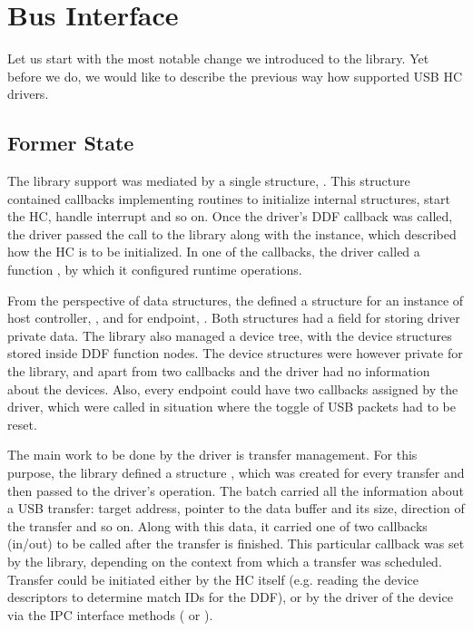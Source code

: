 \section{Bus Interface}

Let us start with the most notable change we introduced to the 
library. Yet before we do, we would like to describe the previous way how
 supported USB HC drivers.

\subsection{Former State}

The library support was mediated by a single structure,
. This structure contained callbacks implementing
routines to initialize internal structures, start the HC, handle interrupt and
so on. Once the driver's DDF callback  was called, the driver
passed the call to the library along with the 
instance, which described how the HC is to be initialized. In one of the
callbacks, the driver called a function , by which
it configured runtime operations.

From the perspective of data structures, the  defined
a structure for an instance of host controller, , and for
endpoint, . Both structures had a field for storing driver
private data. The library also managed a device tree, with the device
structures stored inside DDF function nodes. The device structures were however
private for the library, and apart from two callbacks  and
 the driver had no information about the devices. Also,
every endpoint could have two callbacks assigned by the driver, which were
called in situation where the toggle of USB packets had to be reset.

The main work to be done by the driver is transfer management. For this
purpose, the library defined a structure , which
was created for every transfer and then passed to the driver's 
operation. The batch carried all the information about a USB transfer: target
address, pointer to the data buffer and its size, direction of the transfer and
so on. Along with this data, it carried one of two callbacks (in/out) to be
called after the transfer is finished. This particular callback was set by the
library, depending on the context from which a transfer was scheduled. Transfer
could be initiated either by the HC itself (e.g. reading the device descriptors
to determine match IDs for the DDF), or by the driver of the device via the IPC
interface methods ( or ).

